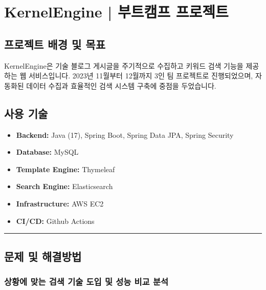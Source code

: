 \documentclass[12pt,a4paper]{article}
\newcommand{\divider}{%
    \vspace{0.5cm}%
    \begin{center}%
    \textcolor{lightgray}{\rule{0.2\textwidth}{0.5pt}}%
    \end{center}%
    \vspace{0.5cm}%
}
\begin{document}



    \section{KernelEngine | 부트캠프 프로젝트}

    \subsection{프로젝트 배경 및 목표}

    KernelEngine은 기술 블로그 게시글을 주기적으로 수집하고 키워드 검색 기능을 제공하는 웹 서비스입니다. 2023년 11월부터 12월까지 3인 팀 프로젝트로 진행되었으며, 자동화된 데이터 수집과 효율적인 검색 시스템 구축에 중점을 두었습니다.



    \subsection{사용 기술}

    \begin{itemize}
        \item \textbf{Backend:} Java (17), Spring Boot, Spring Data JPA, Spring Security
        \item \textbf{Database:} MySQL
        \item \textbf{Template Engine:} Thymeleaf
        \item \textbf{Search Engine:} Elasticsearch
        \item \textbf{Infrastructure:} AWS EC2
        \item \textbf{CI/CD:} Github Actions
    \end{itemize}

    \divider

    \subsection{문제 및 해결방법}

    \subsubsection{상황에 맞는 검색 기술 도입 및 성능 비교 분석}
\end{document}
